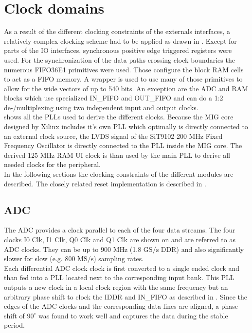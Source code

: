 \section{Clock domains}
\label{sec:fpga_clocks}

As a result of the different clocking constraints of the externals interfaces,
a relatively complex clocking scheme had to be applied as drawn in
. Except for parts of the \acrshort{IO} interfaces,
synchronous positive edge triggered registers were used. For the synchronization
of the data paths crossing clock boundaries the numerous FIFO36E1 primitives
were used. Those configure the block \gls{RAM} cells to act as a \gls{FIFO}
memory. A wrapper is used to use many of those primitives to allow for the
wide vectors of up to 540 bits.
An exception are the \gls{ADC} and \gls{RAM} blocks which use
specialized IN\_FIFO and OUT\_FIFO and can do a 1:2 de-/multiplexing
using two independent input and output clocks. \\

 shows all the \glspl{PLL} used to derive the
different clocks. Because the \gls{MIG} core designed by Xilinx includes
it's own \gls{PLL} which optimally is directly connected to an external
clock source, the \gls{LVDS} signal of the SiT9102 200 MHz Fixed Frequency
Oscillator is directly connected to the \gls{PLL} inside the \gls{MIG} core.
The derived 125 MHz \gls{RAM} \gls{UI} clock is than used by the main
\gls{PLL} to derive all needed clocks for the peripheral. \\

In the following sections the clocking constraints of the different modules
are described. The closely related reset implementation is described
in . \\

\subsection{\gls{ADC}}
The \gls{ADC} provides a clock parallel to each of the four data streams.
The four clocks I0 Clk, I1 Clk, Q0 Clk and Q1 Clk are shown on
 and are referred to as \gls{ADC} clocks.
They can be up to 900 MHz (1.8 $\text{GS}/\text{s}$ \gls{DDR})
and also significantly slower for slow (e.g. 800 $\text{MS}/\text{s}$)
sampling rates. \\

Each differential \gls{ADC} clock clock is first converted to a single ended
clock and than fed into a \gls{PLL} located next to the corresponding input
bank. This \gls{PLL} outputs a new clock in a local clock region
with the same frequency but an arbitrary phase shift
to clock the IDDR and IN\_FIFO as described in .
Since the edges of the \gls{ADC} clocks and the corresponding data lines
are aligned, a phase shift of $90^\circ$ was found to work well and captures
the data during the stable period. \\

